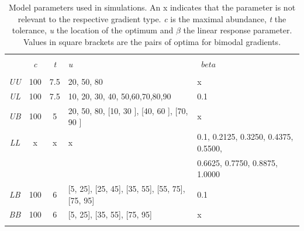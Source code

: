 \documentclass[a4paper,11pt]{article}
\begin{document}
	\captionsetup[table]{name=Table S}
	\begin{table}[!htbp] 
		\centering 
        \caption{
            Model parameters used in simulations. An x indicates that the parameter is not relevant to the respective gradient type. \textit{c} is the maximal abundance, \textit{t} the tolerance, \textit{u} the location of the optimum and $\beta$ the  linear response parameter. Values in square brackets are the pairs of optima for bimodal gradients.
        }
        \label{tab:mvglm:ss} 
        \begin{tabular}{@{\extracolsep{5pt}} cccll}
			\\[-1.8ex]\hline 
            \hline \\[-1.8ex] 
			    & \textit{c} & \textit{t} & \textit{u} &\ $beta$ \\
			\hline \\[-1.8ex]
				\textit{UU} & 100 & 7.5 & 20, 50, 80  & x                 \\
				\textit{UL} & 100 & 7.5 & 10, 20, 30, 40, 50,60,70,80,90 &  0.1  \\
				\textit{UB} & 100 & 5   & 20, 50, 80,  [10, 30 ],  [40, 60 ],  [70, 90 ]  & x \\
				\textit{LL}   & x   & x   & x & 0.1, 0.2125, 0.3250, 0.4375, 0.5500, \\
				&&&& 0.6625, 0.7750, 0.8875, 1.0000      \\ 
			    \textit{LB}  & 100 & 6   & [5, 25], [25, 45], [35, 55], [55, 75], [75, 95] & 0.1   \\
				\textit{BB}   & 100 & 6   & [5, 25], [35, 55], [75, 95] & x  \\
			\hline \\[-1.8ex] 
	    \end{tabular}
		\label{tab:SimDet}
	\end{table}
    \captionsetup[figure]{name=Figure S}
\end{document}
